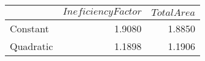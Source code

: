 \begin{tabular}{lrr}
\toprule
{} &  $Ineficiency Factor$ &  $TotalArea$ \\
\midrule
Constant  &                1.9080 &       1.8850 \\
Quadratic &                1.1898 &       1.1906 \\
\bottomrule
\end{tabular}

